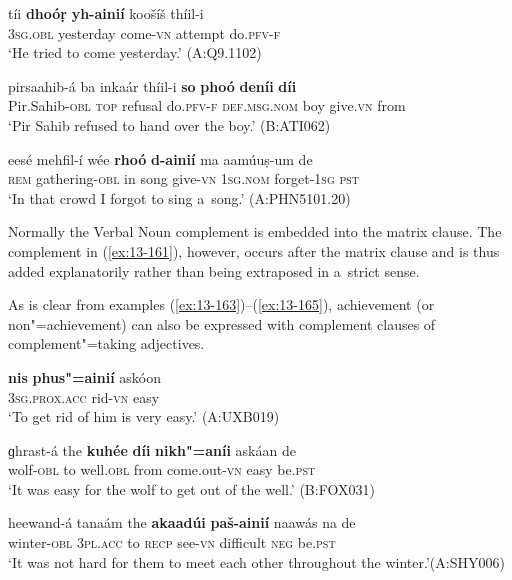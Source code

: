\begin{exe}
\ex
\label{ex:13-160}
\gll tíi \textbf{dhoóṛ} \textbf{yh-ainií} koošíš thíil-i \\
\textsc{3sg.obl} yesterday come-\textsc{vn} attempt do.\textsc{pfv-f} \\
\glt `He tried to come yesterday.' (A:Q9.1102)

\ex
\label{ex:13-161}
\gll pirsaahib-á ba inkaár thíil-i \textbf{so} \textbf{phoó} \textbf{deníi} \textbf{díi}\\
Pir.Sahib-\textsc{obl} \textsc{top} refusal do.\textsc{pfv-f} \textsc{def.msg.nom} boy  give.\textsc{vn} from\\
\glt `Pir Sahib refused to hand over the boy.' (B:ATI062)

\ex
\label{ex:13-162}
\gll eesé mehfil-í wée \textbf{rhoó} \textbf{d-ainií} ma  aamúuṣ-um de \\
\textsc{rem} gathering-\textsc{obl} in song give-\textsc{vn} \textsc{1sg.nom} forget-\textsc{1sg} \textsc{pst} \\
\glt `In that crowd I forgot to sing a~song.' (A:PHN5101.20) 
\end{exe}

Normally the Verbal Noun complement is embedded into the matrix clause. The complement in (\ref{ex:13-161}), however, occurs after the matrix clause and is thus added explanatorily rather than being extraposed in a~strict sense.


As is clear from examples (\ref{ex:13-163})--(\ref{ex:13-165}), achievement (or non"=achievement) can also be expressed with complement clauses of complement"=taking adjectives.

\begin{exe}
\ex
\label{ex:13-163}
\gll \textbf{nis} \textbf{phus"=ainií} askóon \\
\textsc{3sg.prox.acc} rid-\textsc{vn} easy \\
\glt `To get rid of him is very easy.' (A:UXB019)

\ex
\label{ex:13-164}
\gll ɡhrast-á the \textbf{kuhée} \textbf{díi} \textbf{nikh"=aníi} askáan de  \\
wolf-\textsc{obl} to well.\textsc{obl} from come.out-\textsc{vn} easy be.\textsc{pst}  \\
\glt `It was easy for the wolf to get out of the well.' (B:FOX031)

\ex
\label{ex:13-165}
\gll heewand-á tanaám the \textbf{akaadúi} \textbf{paš-ainií} naawás  na de \\
winter-\textsc{obl} \textsc{3pl.acc} to \textsc{recp} see-\textsc{vn} difficult \textsc{neg} be.\textsc{pst} \\
\glt `It was not hard for them to meet each other throughout the winter.'\newline (A:SHY006) 
\end{exe}

